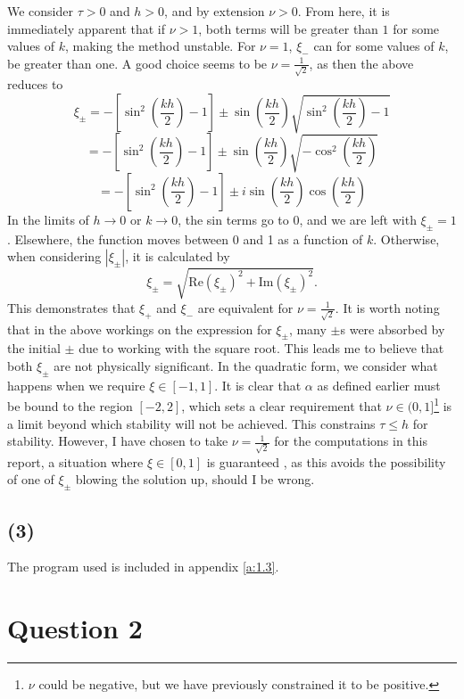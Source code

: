 \documentclass[10pt]{article}
\begin{document}
We consider $\tau >0$ and $h>0$, and by extension $\nu>0$.
From here, it is immediately apparent that if $\nu >1$, both terms will be greater
than $1$ for some values of $k$, making the method unstable.
For $\nu = 1$, $\xi_-$ can for some values of $k$, be greater than one.
A good choice seems to be $\nu = \frac{1}{\sqrt{2}}$, as then the above reduces to
$$\xi_\pm = -\left[\sin^2\left(\frac{kh}{2}\right) - 1 \right] \pm \sin\left(\frac{kh}{2}\right)
\sqrt{\sin^2\left(\frac{kh}{2}\right) -1}$$
$$= -\left[\sin^2\left(\frac{kh}{2}\right) - 1 \right] \pm \sin\left(\frac{kh}{2}\right)
\sqrt{-\cos^2\left(\frac{kh}{2}\right)}$$
$$= -\left[\sin^2\left(\frac{kh}{2}\right) - 1 \right] \pm i\sin\left(\frac{kh}{2}\right)
\cos\left(\frac{kh}{2}\right)$$
In the limits of $h \to 0$ or $k \to 0$, the sin terms go to 0, and we are left with
$\xi_\pm = 1$. Elsewhere, the function moves between 0 and 1 as a function of $k$.
Otherwise, when considering $|\xi_\pm|$, it is calculated by
$$ \xi_\pm = \sqrt{\text{Re}\left(\xi_\pm\right)^2 + \text{Im}\left(\xi_\pm\right)^2}.$$
This demonstrates that $\xi_+$ and $\xi_-$ are equivalent for $\nu=\frac{1}{\sqrt{2}}$.
It is worth noting that in
the above workings on the expression for $\xi_\pm$, many $\pm$s were absorbed by the
initial $\pm$ due to working with the square root. This leads me to believe that both
$\xi_\pm$ are not physically significant.
In the quadratic form, we consider what happens when we require $\xi \in [-1,1]$.
It is clear that $\alpha$ as defined earlier must be bound to the region $[-2,2]$,
which sets a clear requirement that $\nu \in (0,1]$\footnote{$\nu$ could be negative, but
we have previously constrained it to be positive.}
is a limit beyond which stability will not be achieved. This constrains
$\tau \le h$ for stability.
However, I have chosen to take $\nu = \frac{1}{\sqrt{2}}$
for the computations in this report, a situation where $\xi \in [0,1]$ is guaranteed
, as this avoids the possibility of one of $\xi_\pm$ blowing the solution up, should I be wrong.


\subsection*{(3)}
The program used is included in appendix \ref{a:1.3}.


\section*{Question 2}
\end{document}
